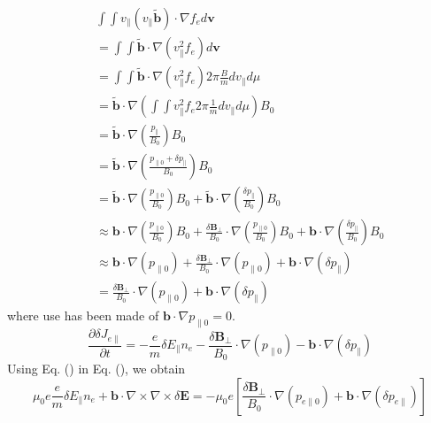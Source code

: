 \documentclass{article}
\begin{document}
\begin{eqnarray}
  &  & \int \int v_{\parallel} (v_{\parallel} \tilde{\mathbf{b}}) \cdot
  \nabla f_e d\mathbf{v} \nonumber\\
  &  & = \int \int \tilde{\mathbf{b}} \cdot \nabla (v_{\parallel}^2 f_e)
  d\mathbf{v} \nonumber\\
  &  & = \int \int \tilde{\mathbf{b}} \cdot \nabla (v_{\parallel}^2 f_e) 2
  \pi \frac{B}{m} d v_{\parallel} d \mu \nonumber\\
  &  & = \tilde{\mathbf{b}} \cdot \nabla \left( \int \int v_{\parallel}^2 f_e
  2 \pi \frac{1}{m} d v_{\parallel} d \mu \right) B_0 \nonumber\\
  &  & = \tilde{\mathbf{b}} \cdot \nabla \left( \frac{p_{\parallel}}{B_0}
  \right) B_0 \nonumber\\
  &  & = \tilde{\mathbf{b}} \cdot \nabla \left( \frac{p_{\parallel 0} +
  \delta p_{\parallel}}{B_0} \right) B_0 \nonumber\\
  &  & = \tilde{\mathbf{b}} \cdot \nabla \left( \frac{p_{\parallel 0}}{B_0}
  \right) B_0 + \tilde{\mathbf{b}} \cdot \nabla \left( \frac{\delta
  p_{\parallel}}{B_0} \right) B_0 \nonumber\\
  &  & \approx \mathbf{b} \cdot \nabla \left( \frac{p_{\parallel 0}}{B_0}
  \right) B_0 + \frac{\delta \mathbf{B}_{\perp}}{B_0} \cdot \nabla \left(
  \frac{p_{\parallel 0}}{B_0} \right) B_0 +\mathbf{b} \cdot \nabla \left(
  \frac{\delta p_{\parallel}}{B_0} \right) B_0 \nonumber\\
  &  & \approx \mathbf{b} \cdot \nabla (p_{\parallel 0}) + \frac{\delta
  \mathbf{B}_{\perp}}{B_0} \cdot \nabla (p_{\parallel 0}) +\mathbf{b} \cdot
  \nabla (\delta p_{\parallel}) \\
  &  & = \frac{\delta \mathbf{B}_{\perp}}{B_0} \cdot \nabla (p_{\parallel 0})
  +\mathbf{b} \cdot \nabla (\delta p_{\parallel}) \nonumber
\end{eqnarray}
where use has been made of $\mathbf{b} \cdot \nabla p_{\parallel 0} = 0$.
\begin{equation}
  \frac{\partial \delta J_{e \parallel}}{\partial t} = - \frac{e}{m} \delta
  E_{\parallel} n_e - \frac{\delta \mathbf{B}_{\perp}}{B_0} \cdot \nabla
  (p_{\parallel 0}) -\mathbf{b} \cdot \nabla (\delta p_{\parallel})
\end{equation}
Using Eq. () in Eq. (), we obtain
\begin{equation}
  \mu_0 e \frac{e}{m} \delta E_{\parallel} n_e +\mathbf{b} \cdot \nabla \times
  \nabla \times \delta \mathbf{E}= - \mu_0 e \left[ \frac{\delta
  \mathbf{B}_{\perp}}{B_0} \cdot \nabla (p_{e \parallel 0}) +\mathbf{b} \cdot
  \nabla (\delta p_{e \parallel}) \right]
\end{equation}
\end{document}
